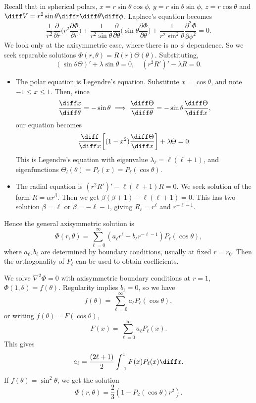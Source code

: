 \documentclass[12pt]{article}
\begin{document}
Recall that in spherical polars, $x = r \sin \theta \cos \phi$, $y = r \sin \theta \sin \phi$, $z = r \cos \theta$ and $\diff V = r^2 \sin \theta \diff r \diff \theta \diff \phi$. Laplace's equation becomes
\[
	\frac{1}{r^2}\frac{\partial}{\partial r}\biggl(r^2 \frac{\partial \Phi}{\partial r}\biggr) + \frac{1}{r^2 \sin \theta} \frac{\partial}{\partial \theta} \biggl( \sin \theta \frac{\partial \Phi}{\partial \theta}\biggr) + \frac{1}{r^2\sin^2\theta} \frac{\partial^2\Phi}{\partial \phi^2} = 0
.\]
We look only at the axisymmetric case, where there is no $\phi$ dependence. So we seek separable solutions $\Phi(r, \theta) = R(r) \Theta(\theta)$. Substituting,
\[
	(\sin \theta \Theta)' + \lambda \sin \theta = 0, \quad (r^2R')' - \lambda R = 0
.\]
\begin{itemize}
	\item The polar equation is Legendre's equation. Substitute $x = \cos \theta$, and note $-1 \leq x \leq 1$. Then, since
		\[
		\frac{\diff x}{\diff \theta} = - \sin \theta \implies \frac{\diff \Theta}{\diff \theta} = - \sin \theta \frac{\diff \Theta}{\diff x}
		,\]
		our equation becomes
		\[
			\frac{\diff}{\diff x} \biggl[(1- x^2) \frac{\diff \Theta}{\diff x} \biggr] + \lambda \Theta = 0
		.\]
		This is Legendre's equation with eigenvalue $\lambda_{\ell} = \ell(\ell + 1)$, and eigenfunctions $\Theta_l(\theta) = P_{\ell}(x) = P_{\ell}(\cos \theta)$.
	\item The radial equation is $(r^2R')' - \ell(\ell+1)R = 0$. We seek solution of the form $R = \alpha r^{\beta}$. Then we get $\beta(\beta + 1) - \ell(\ell + 1) = 0$. This has two solution $\beta = \ell$ or $\beta = - \ell - 1$, giving $R_\ell = r^{\ell}$ and $r^{- \ell - 1}$.
\end{itemize}

Hence the general axisymmetric solution is
\[
	\Phi(r, \theta) = \sum_{\ell = 0}^{\infty} (a_{\ell}r^{\ell} + b_{\ell} r^{-\ell - 1}) P_{\ell}(\cos \theta)
,\]
where $a_{\ell}, b_{\ell}$ are determined by boundary conditions, usually at fixed $r = r_0$. Then the orthogonality of $P_{\ell}$ can be used to obtain coefficients.

\begin{exbox}
	We solve $\nabla^2 \Phi = 0$ with axisymmetric boundary conditions at $r = 1$, $\Phi(1, \theta) = f(\theta)$. Regularity implies $b_{\ell} = 0$, so we have
	\[
		f(\theta) = \sum_{\ell = 0}^{\infty} a_{\ell} P_{\ell}(\cos \theta)
	,\]
	or writing $f(\theta) = F(\cos \theta)$,
	\[
		F(x) = \sum_{\ell = 0}^{\infty}a_{\ell} P_{\ell}(x)
	.\]
	This gives
	\[
		a_{\ell} = \frac{(2 \ell + 1)}{2}\int_{-1}^{1}F(x)P_{\ell}(x)\diff x
	.\]
	If $f(\theta) = \sin^2 \theta$, we get the solution
	\[
		\Phi(r, \theta) = \frac{2}{3}(1 - P_2(\cos \theta)r^2)
	.\]
\end{exbox}
\end{document}
